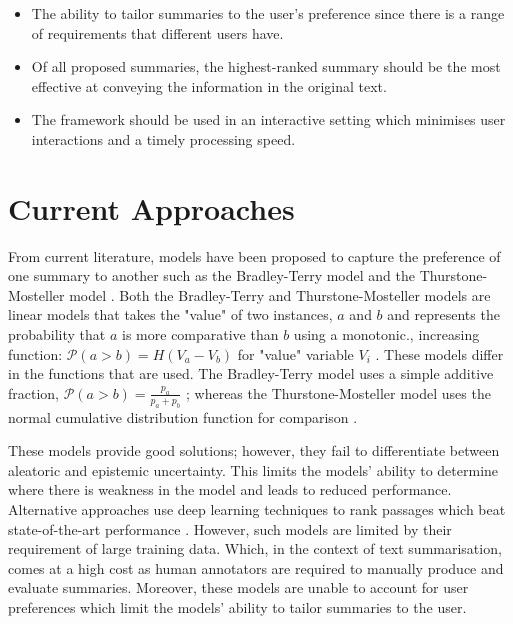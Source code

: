 \documentclass[ %
                    author={James Stephenson},
                supervisor={Dr. Edwin Simpson},
                    degree={MSc},
                     title={PROJECT PLAN},
                  subtitle={Bayesian Deep Learning For Extractive Test Summarisation},
                      type={},
                      year={2022}]{../additions/dissertation}
\begin{document}
		\begin{itemize}
			\item {The ability to tailor summaries to the user’s preference since there is a range of requirements that different users have.}
			\item{Of all proposed summaries, the highest-ranked summary should be the most effective at conveying the information in the original text.}
			\item {The framework should be used in an interactive setting which minimises user interactions and a timely processing speed.}
		\end{itemize}
		
		\section{Current Approaches}
		\label{chap:introduction:curr_approaches}
		
			From current literature, models have been proposed to capture the preference of one summary to another such as the Bradley-Terry model \cite{Bradley52} and the Thurstone-Mosteller model \cite{Thurstone27, Mosteller51}. Both the Bradley-Terry and Thurstone-Mosteller models are linear models that takes the "value" of two instances, $a$ and $b$ and represents the probability that $a$ is more comparative than $b$ using a monotonic., increasing function: $\mathcal{P}(a > b) = H(V_a - V_b) $ for "value" variable $V_i$ \cite{Handley01}. These models differ in the functions that are used. The Bradley-Terry model uses a simple additive fraction, $\mathcal{P}(a > b) = \frac{p_a}{p_a + p_b}$ \cite{Hunter04}; whereas the Thurstone-Mosteller model uses  the normal cumulative distribution function for comparison \cite{Handley01}.
		
		\medbreak
		These models provide good solutions; however, they fail to differentiate between aleatoric and epistemic uncertainty. This limits the models’ ability to determine where there is weakness in the model and leads to reduced performance. Alternative approaches use deep learning techniques to rank passages which beat state-of-the-art performance \cite{Xu19}. However, such models are limited by their requirement of large training data. Which, in the context of text summarisation, comes at a high cost as human annotators are required to manually produce and evaluate summaries. Moreover, these models are unable to account for user preferences which limit the models' ability to tailor summaries to the user.
		
\end{document}
